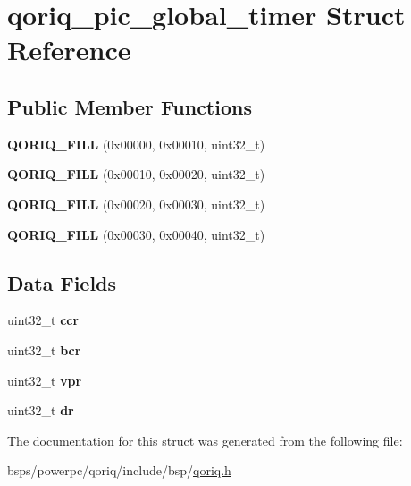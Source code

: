 \hypertarget{structqoriq__pic__global__timer}{}\section{qoriq\+\_\+pic\+\_\+global\+\_\+timer Struct Reference}
\label{structqoriq__pic__global__timer}
\subsection*{Public Member Functions}
\begin{DoxyCompactItemize}
\item 
\mbox{\label{structqoriq__pic__global__timer_adab1d34156f20766d1cb7249fefe5790}} 
{\bfseries Q\+O\+R\+I\+Q\+\_\+\+F\+I\+LL} (0x00000, 0x00010, uint32\+\_\+t)
\item 
\mbox{\label{structqoriq__pic__global__timer_acff99041b77426e5ea0baf97a7a88746}} 
{\bfseries Q\+O\+R\+I\+Q\+\_\+\+F\+I\+LL} (0x00010, 0x00020, uint32\+\_\+t)
\item 
\mbox{\label{structqoriq__pic__global__timer_a183f24dd944e18eac85302e31d6a05f6}} 
{\bfseries Q\+O\+R\+I\+Q\+\_\+\+F\+I\+LL} (0x00020, 0x00030, uint32\+\_\+t)
\item 
\mbox{\label{structqoriq__pic__global__timer_a3272675eb04632ffd3ca91de853ba3ad}} 
{\bfseries Q\+O\+R\+I\+Q\+\_\+\+F\+I\+LL} (0x00030, 0x00040, uint32\+\_\+t)
\end{DoxyCompactItemize}
\subsection*{Data Fields}
\begin{DoxyCompactItemize}
\item 
\mbox{\label{structqoriq__pic__global__timer_a94287689b3badc1435ef8e9afc676283}} 
uint32\+\_\+t {\bfseries ccr}
\item 
\mbox{\label{structqoriq__pic__global__timer_a78605c476b7f367dc5c3f256966cbbdb}} 
uint32\+\_\+t {\bfseries bcr}
\item 
\mbox{\label{structqoriq__pic__global__timer_abb8861a48f944799b61650f9d415da63}} 
uint32\+\_\+t {\bfseries vpr}
\item 
\mbox{\label{structqoriq__pic__global__timer_a28db58bf427a9fdb9dde0e62ea467ae2}} 
uint32\+\_\+t {\bfseries dr}
\end{DoxyCompactItemize}


The documentation for this struct was generated from the following file\+:\begin{DoxyCompactItemize}
\item 
bsps/powerpc/qoriq/include/bsp/\mbox{\hyperlink{qoriq_8h}{qoriq.\+h}}\end{DoxyCompactItemize}
